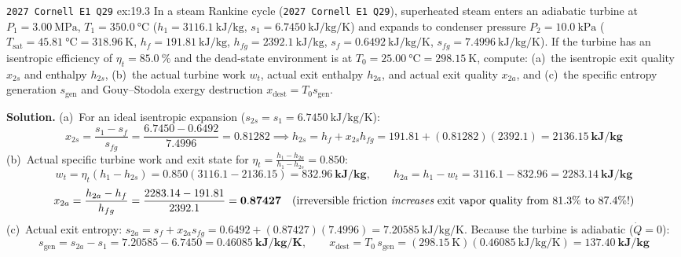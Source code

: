 \begin{workedexample}{\texttt{2027 Cornell E1 Q29} }{ex:19.3}
In a steam Rankine cycle (\texttt{2027 Cornell E1 Q29}), superheated steam enters an adiabatic turbine at $P_1 = \SI{3.00}{\mega\pascal}$, $T_1 = \SI{350.0}{\celsius}$ ($h_1 = \SI{3116.1}{\kilo\joule\per\kilogram}$, $s_1 = \SI{6.7450}{\kilo\joule\per\kilogram\per\kelvin}$) and expands to condenser pressure $P_2 = \SI{10.0}{\kilo\pascal}$ ($T_{\mathrm{sat}} = \SI{45.81}{\celsius} = \SI{318.96}{\kelvin}$, $h_f = \SI{191.81}{\kilo\joule\per\kilogram}$, $h_{fg} = \SI{2392.1}{\kilo\joule\per\kilogram}$, $s_f = \SI{0.6492}{\kilo\joule\per\kilogram\per\kelvin}$, $s_{fg} = \SI{7.4996}{\kilo\joule\per\kilogram\per\kelvin}$). If the turbine has an isentropic efficiency of $\eta_t = \SI{85.0}{\percent}$ and the dead-state environment is at $T_0 = \SI{25.00}{\celsius} = \SI{298.15}{\kelvin}$, compute: (a)~the isentropic exit quality $x_{2s}$ and enthalpy $h_{2s}$, (b)~the actual turbine work $w_t$, actual exit enthalpy $h_{2a}$, and actual exit quality $x_{2a}$, and (c)~the specific entropy generation $s_{\mathrm{gen}}$ and Gouy--Stodola exergy destruction $x_{\mathrm{dest}} = T_0 s_{\mathrm{gen}}$.
\par\smallskip\noindent
\textbf{Solution.}
(a)~For an ideal isentropic expansion ($s_{2s} = s_1 = \SI{6.7450}{\kilo\joule\per\kilogram\per\kelvin}$):
$$x_{2s} = \frac{s_1 - s_f}{s_{fg}} = \frac{6.7450 - 0.6492}{7.4996} = \mathbf{0.81282} \implies h_{2s} = h_f + x_{2s} h_{fg} = 191.81 + (0.81282)(2392.1) = \mathbf{\SI{2136.15}{\kilo\joule\per\kilogram}}$$
(b)~Actual specific turbine work and exit state for $\eta_t = \frac{h_1 - h_{2a}}{h_1 - h_{2s}} = 0.850$:
$$w_t = \eta_t(h_1 - h_{2s}) = 0.850(3116.1 - 2136.15) = \mathbf{\SI{832.96}{\kilo\joule\per\kilogram}}, \qquad h_{2a} = h_1 - w_t = 3116.1 - 832.96 = \mathbf{\SI{2283.14}{\kilo\joule\per\kilogram}}$$
$$x_{2a} = \frac{h_{2a} - h_f}{h_{fg}} = \frac{2283.14 - 191.81}{2392.1} = \mathbf{0.87427} \quad (\text{irreversible friction }\emph{increases}\text{ exit vapor quality from }81.3\%\text{ to }87.4\%\text{!})$$
(c)~Actual exit entropy: $s_{2a} = s_f + x_{2a} s_{fg} = 0.6492 + (0.87427)(7.4996) = \SI{7.20585}{\kilo\joule\per\kilogram\per\kelvin}$. Because the turbine is adiabatic ($\dot{Q}=0$):
$$s_{\mathrm{gen}} = s_{2a} - s_1 = 7.20585 - 6.7450 = \mathbf{\SI{0.46085}{\kilo\joule\per\kilogram\per\kelvin}}, \qquad x_{\mathrm{dest}} = T_0\,s_{\mathrm{gen}} = (\SI{298.15}{\kelvin})(\SI{0.46085}{\kilo\joule\per\kilogram\per\kelvin}) = \mathbf{\SI{137.40}{\kilo\joule\per\kilogram}}$$
\end{workedexample}

